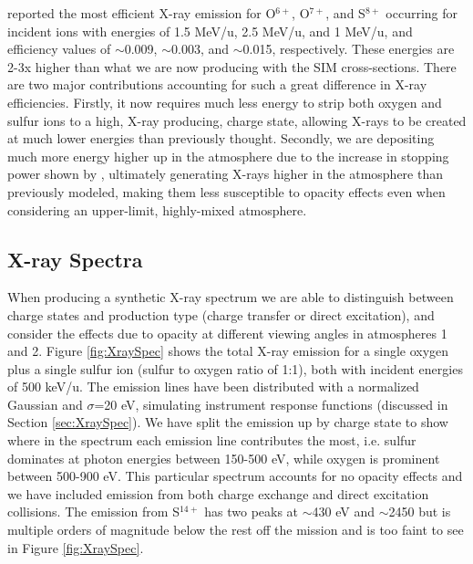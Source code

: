 \documentclass[draft]{agujournal2018}
\begin{document}
\citet{ozak2010} reported the most efficient X-ray emission for O$^{6+}$, O$^{7+}$, and S$^{8+}$ occurring for incident ions with energies of 1.5 MeV/u, 2.5 MeV/u, and 1 MeV/u, and efficiency values of $\sim$0.009, $\sim$0.003, and $\sim$0.015, respectively.
These energies are 2-3x higher than what we are now producing with the SIM cross-sections.
There are two major contributions accounting for such a great difference in X-ray efficiencies.
Firstly, it now requires much less energy to strip both oxygen and sulfur ions to a high, X-ray producing, charge state, allowing X-rays to be created at much lower energies than previously thought.
Secondly, we are depositing much more energy higher up in the atmosphere due to the increase in stopping power shown by \citet{schultz2018}, ultimately generating X-rays higher in the atmosphere than previously modeled, making them less susceptible to opacity effects even when considering an upper-limit, highly-mixed atmosphere.

\subsection{X-ray Spectra}

When producing a synthetic X-ray spectrum we are able to distinguish between charge states and production type (charge transfer or direct excitation), and consider the effects due to opacity at different viewing angles in atmospheres 1 and 2.
Figure \ref{fig:XraySpec} shows the total X-ray emission for a single oxygen plus a single sulfur ion (sulfur to oxygen ratio of 1:1), both with incident energies of 500 keV/u.
The emission lines have been distributed with a normalized Gaussian and $\sigma$=20 eV, simulating instrument response functions (discussed in Section \ref{sec:XraySpec}).
We have split the emission up by charge state to show where in the spectrum each emission line contributes the most, i.e. sulfur dominates at photon energies between 150-500 eV, while oxygen is prominent between 500-900 eV.
This particular spectrum accounts for no opacity effects and we have included emission from both charge exchange and direct excitation collisions.
The emission from S$^{14+}$ has two peaks at $\sim$430 eV and $\sim$2450 but is multiple orders of magnitude below the rest off the mission and is too faint to see in Figure \ref{fig:XraySpec}.
\end{document}
